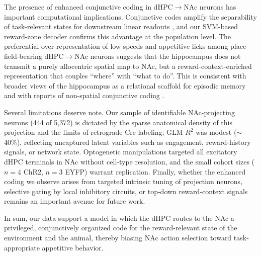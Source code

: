 \documentclass[10pt,a4paper]{article}
\begin{document}
The presence of enhanced conjunctive coding in dHPC$\rightarrow$NAc neurons has important computational implications. Conjunctive codes amplify the separability of task-relevant states for downstream linear readouts \cite{fusi2016neurons,rigotti2013importance}, and our SVM-based reward-zone decoder confirms this advantage at the population level. The preferential over-representation of low speeds and appetitive licks among place-field-bearing dHPC$\rightarrow$NAc neurons suggests that the hippocampus does not transmit a purely allocentric spatial map to NAc, but a reward-context-enriched representation that couples ``where'' with ``what to do''. This is consistent with broader views of the hippocampus as a relational scaffold for episodic memory \cite{eichenbaum2014can} and with reports of non-spatial conjunctive coding \cite{wood2000hippocampal,mckenzie2014hippocampal,hardcastle2017multiplexed}.

Several limitations deserve note. Our sample of identifiable NAc-projecting neurons (444 of 5{,}372) is dictated by the sparse anatomical density of this projection and the limits of retrograde Cre labeling; GLM $R^2$ was modest ($\sim$40\%), reflecting uncaptured latent variables such as engagement, reward-history signals, or network state. Optogenetic manipulations targeted all excitatory dHPC terminals in NAc without cell-type resolution, and the small cohort sizes ($n=4$ ChR2, $n=3$ EYFP) warrant replication. Finally, whether the enhanced coding we observe arises from targeted intrinsic tuning of projection neurons, selective gating by local inhibitory circuits, or top-down reward-context signals remains an important avenue for future work.

In sum, our data support a model in which the dHPC routes to the NAc a privileged, conjunctively organized code for the reward-relevant state of the environment and the animal, thereby biasing NAc action selection toward task-appropriate appetitive behavior.



\end{document}
